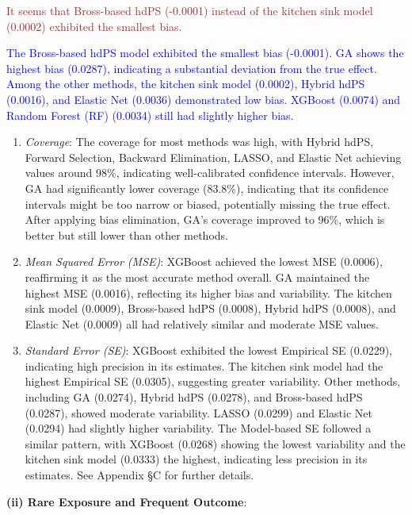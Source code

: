 \documentclass[sn-vancouver,Numbered,lineno,pdflatex]{sn-jnl}
\begin{document}
\textcolor{brown}{It seems that Bross-based hdPS (-0.0001) instead of the kitchen sink model (0.0002) exhibited the smallest bias.}

\textcolor{blue}{The Bross-based hdPS model exhibited the smallest bias (-0.0001). GA shows the highest bias (0.0287), indicating a substantial deviation from the true effect. Among the other methods, the kitchen sink model (0.0002), Hybrid hdPS (0.0016), and Elastic Net (0.0036) demonstrated low bias. XGBoost (0.0074) and Random Forest (RF) (0.0034) still had slightly higher bias.}

\begin{enumerate}
\def\labelenumi{\arabic{enumi}.}
\setcounter{enumi}{1}
\item
  \emph{Coverage}: The coverage for most methods was high, with Hybrid
  hdPS, Forward Selection, Backward Elimination, LASSO, and Elastic Net
  achieving values around 98\%, indicating well-calibrated confidence
  intervals. However, GA had significantly lower coverage (83.8\%),
  indicating that its confidence intervals might be too narrow or
  biased, potentially missing the true effect. After applying bias
  elimination, GA's coverage improved to 96\%, which is better but still
  lower than other methods.
\item
  \emph{Mean Squared Error (MSE)}: XGBoost achieved the lowest MSE
  (0.0006), reaffirming it as the most accurate method overall. GA
  maintained the highest MSE (0.0016), reflecting its higher bias and
  variability. The kitchen sink model (0.0009), Bross-based hdPS
  (0.0008), Hybrid hdPS (0.0008), and Elastic Net (0.0009) all had
  relatively similar and moderate MSE values.
\item
  \emph{Standard Error (SE)}: XGBoost exhibited the lowest Empirical SE
  (0.0229), indicating high precision in its estimates. The kitchen sink
  model had the highest Empirical SE (0.0305), suggesting greater
  variability. Other methods, including GA (0.0274), Hybrid hdPS
  (0.0278), and Bross-based hdPS (0.0287), showed moderate variability.
  LASSO (0.0299) and Elastic Net (0.0294) had slightly higher
  variability. The Model-based SE followed a similar pattern, with
  XGBoost (0.0268) showing the lowest variability and the kitchen sink
  model (0.0333) the highest, indicating less precision in its
  estimates. See Appendix \S C for further details.
\end{enumerate}

\textbf{(ii) Rare Exposure and Frequent Outcome}:
\end{document}
